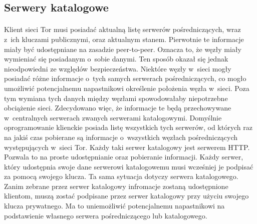 \subsection{Serwery katalogowe}\paragraph{}
Klient sieci Tor musi posiadać aktualną listę serwerów pośredniczących, wraz z~ich kluczami publicznymi, oraz aktualnym stanem. Pierwotnie te informacje miały być udostępniane na zasadzie peer-to-peer. Oznacza to, że węzły miały wymieniać się posiadanym o~sobie danymi. Ten sposób okazał się jednak nieodpowiedni ze względów bezpieczeństwa. Niektóre węzły w~sieci mogły posiadać różne informacje o~tych samych serwerach pośredniczących, co mogło umożliwić potencjalnemu napastnikowi określenie położenia węzła w~sieci. Poza tym wymiana tych danych między węzłami spowodowałaby niepotrzebne obciążenie sieci. Zdecydowano więc, że informacje te będą przechowywane w~centralnych serwerach zwanych serwerami katalogowymi. Domyślnie oprogramowanie klienckie posiada listę wszystkich tych serwerów, od których raz na jakiś czas pobierane są informacje o~wszystkich węzłach pośredniczących występujących w~sieci Tor. Każdy taki serwer katalogowy jest serwerem HTTP. Pozwala to na proste udostępnianie oraz pobieranie informacji. Każdy serwer, który udostępnia swoje dane serwerowi katalogowemu musi wcześniej je podpisać za pomocą swojego klucza. Ta sama sytuacja dotyczy serwera katalogowego. Zanim zebrane przez serwer katalogowy infromacje zostaną udostępnione klientom, muszą zostać podpisane przez serwer katalogowy przy użyciu swojego klucza prywatnego. Ma to uniemożliwić potencjalnemu napastnikowi na podstawienie własnego serwera pośredniczącego lub katalogowego\cite{tor_design}.
